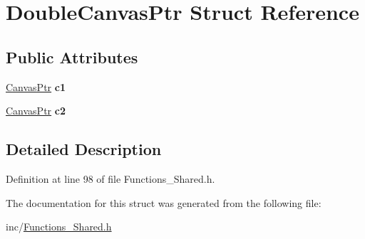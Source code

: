 \hypertarget{structDoubleCanvasPtr}{\section{Double\-Canvas\-Ptr Struct Reference}
\label{structDoubleCanvasPtr}
}
\subsection*{Public Attributes}
\begin{DoxyCompactItemize}
\item 
\hypertarget{structDoubleCanvasPtr_a8b1429eab4f3b33fab0d9c9e5463793e}{\hyperlink{structCanvasPtr}{Canvas\-Ptr} {\bfseries c1}}\label{structDoubleCanvasPtr_a8b1429eab4f3b33fab0d9c9e5463793e}

\item 
\hypertarget{structDoubleCanvasPtr_a492dc9e6fc2eb8296e807db5e44c0bed}{\hyperlink{structCanvasPtr}{Canvas\-Ptr} {\bfseries c2}}\label{structDoubleCanvasPtr_a492dc9e6fc2eb8296e807db5e44c0bed}

\end{DoxyCompactItemize}


\subsection{Detailed Description}


Definition at line 98 of file Functions\-\_\-\-Shared.\-h.



The documentation for this struct was generated from the following file\-:\begin{DoxyCompactItemize}
\item 
inc/\hyperlink{Functions__Shared_8h}{Functions\-\_\-\-Shared.\-h}\end{DoxyCompactItemize}
